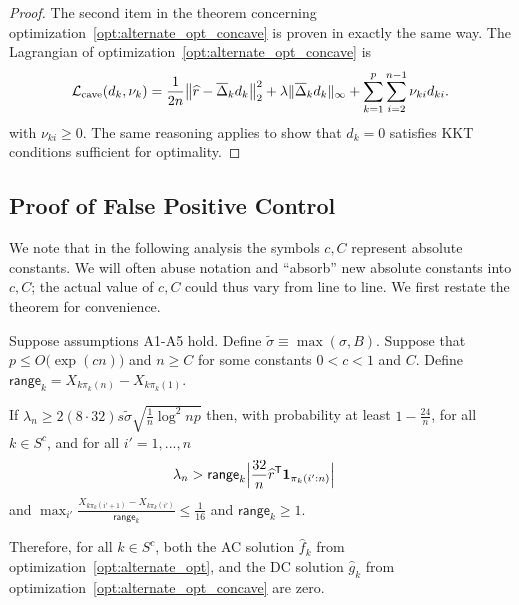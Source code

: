 \begin{proof}
The second item in the theorem concerning optimization~\ref{opt:alternate_opt_concave} is proven in exactly the same way. 
The Lagrangian of optimization~\ref{opt:alternate_opt_concave} is
\[
\mathcal{L}_{\textrm{cave}}(d_k, \nu_k) = 
  \frac{1}{2n} \big\| \widehat{r} - \overline{\Delta}_k d_k \big \|_2^2 + 
  \lambda \| \overline{\Delta}_k d_k \|_\infty + \sum_{k=1}^p \sum_{i=2}^{n-1} \nu_{ki} d_{ki}.
\]
with $\nu_{ki} \geq 0$.
The same reasoning applies to show that $\hat{d}_k = 0$ satisfies KKT conditions sufficient for optimality.
\end{proof}
 
 
 
 \subsection{Proof of False Positive Control}
 \label{sec:false_positive_proof}
 
 We note that in the following analysis the symbols $c,C$ represent
 absolute constants. We will often abuse notation and ``absorb'' new
 absolute constants into $c, C$; the actual value of $c, C$ could thus
 vary from line to line.
We first restate the theorem for convenience. 

\begin{theorem} 
Suppose assumptions A1-A5 hold. Define $\tilde{\sigma} \equiv \max(\sigma, B)$. Suppose that $p \leq O\big( \exp( c n) \big)$ and $n \geq C$ for some constants $0<c<1$ and $C$. Define $\mathsf{range}_k = X_{k\pi_k(n)} - X_{k\pi_k(1)}$.

If $\lambda_n \geq 2 (8 \cdot 32) s \tilde{\sigma}  \sqrt{ \frac{1}{n} \log^2 np}$ then, with probability at least $ 1 - \frac{24}{n}$, for all $k \in S^c$, and for all $i'=1,...,n$
\begin{align*}
& \lambda_n > \mathsf{range}_k \Big| \frac{32}{n}\widehat{r}^{\mathsf{T}} \mbox{\boldmath $1$}_{\pi_k(i':n)} \Big|  
\end{align*}
and $\max_{i'} \frac{X_{k\pi_k(i'+1)} - X_{k \pi_k(i')}}{\mathsf{range}_k} \leq \frac{1}{16}$ and $\mathsf{range}_k \geq 1$.

Therefore, for all $k \in S^c$, both the AC solution $\hat{f}_k$ from optimization~\ref{opt:alternate_opt}, and the DC solution $\hat{g}_k$ from optimization~\ref{opt:alternate_opt_concave} are zero. 
\end{theorem}

